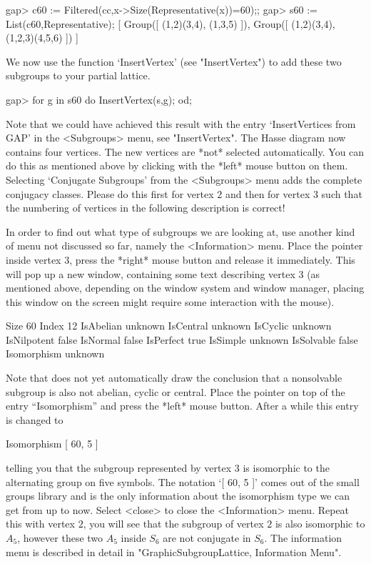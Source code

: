 \begintt
gap> c60 := Filtered(cc,x->Size(Representative(x))=60);;
gap> s60 := List(c60,Representative);
[ Group([ (1,2)(3,4), (1,3,5) ]), Group([ (1,2)(3,4), (1,2,3)(4,5,6) ]) ]
\endtt

\label{xgapgap}
We now use the function `InsertVertex' (see "InsertVertex") to add
these two subgroups to your partial lattice.

\begintt
gap> for g in s60 do InsertVertex(s,g); od;
\endtt

Note  that  we  could have    achieved   this result  with the   entry
`InsertVertices from GAP'  in   the    <Subgroups>  menu,   see
"InsertVertex".  The  Hasse diagram now  contains  four vertices.  The
new  vertices are  *not* selected automatically.   You can do  this as
mentioned above  by clicking with  the *left*  mouse button on  them.  
Selecting `Conjugate Subgroups' from the <Subgroups> menu adds the
complete conjugacy classes.  Please do  this first for vertex $2$  and
then   for vertex $3$   such that  the  numbering of  vertices  in the
following description is correct!

In order  to find out  what type of subgroups  we  are looking at, use
another  kind of menu not  discussed  so far, namely the <Information>
menu.  Place the pointer inside  vertex $3$,  press the *right*  mouse
button and release  it immediately.  This  will  pop up a  new window,
containing some text    describing  vertex $3$ (as   mentioned  above,
depending on the window system and window manager, placing this window
on the screen might require some interaction with the mouse).

\begintt
Size        60
Index       12
IsAbelian   unknown
IsCentral   unknown
IsCyclic    unknown
IsNilpotent false
IsNormal    false
IsPerfect   true
IsSimple    unknown
IsSolvable  false
Isomorphism unknown
\endtt

Note that {\GAP} does not yet automatically draw the conclusion that a
nonsolvable subgroup  is also not  abelian, cyclic or central.  Place the
pointer on top of the entry ``Isomorphism'' and press the *left* mouse
button.  After a while this entry is changed to

\begintt
Isomorphism [ 60, 5 ]
\endtt

telling you that the subgroup represented by vertex $3$ is isomorphic to
the alternating group on five symbols.  The notation `[ 60, 5 ]' comes out
of the small groups library and is the only information about the
isomorphism type we can get from {} up to now. Select <close> to close
the <Information> menu.  Repeat this with vertex $2$, you will see that the
subgroup of vertex $2$ is also isomorphic to $A_5$, however these two $A_5$
inside $S_6$ are not conjugate in $S_6$.  The information menu is described
in detail in "GraphicSubgroupLattice, Information Menu".

